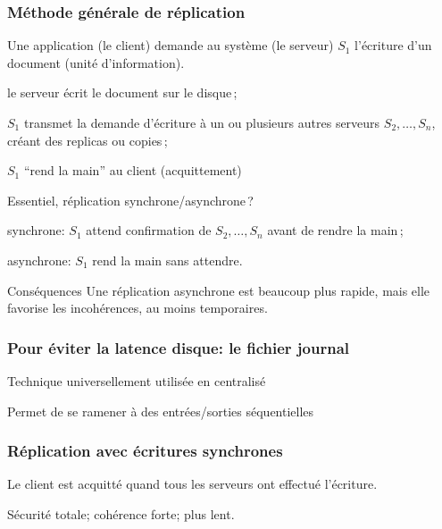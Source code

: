 \begin{frame}
\frametitle{Méthode générale de réplication}

Une \alert{application} (le client) demande au \alert{système} (le serveur) $S_1$ \alert{l'écriture}
d'un document (unité d'information).

\begin{redbullet}
  \item le serveur écrit le document sur le disque\,; 
  \item \alert{$S_1$ transmet la demande d'écriture à un ou plusieurs autres serveurs $S_2, \ldots, S_n$}, créant
     des \alert{replicas} ou \alert{copies}\,;
  \item $S_1$ ``rend la main'' au client (acquittement)
\end{redbullet}

Essentiel, réplication synchrone/asynchrone\,?

\begin{redbullet}
  \item \alert{synchrone}: $S_1$ \alert{attend} confirmation de $S_2, \ldots, S_n$ avant de rendre la main\,; 
 \item \alert{asynchrone}: $S_1$ rend la main \alert{sans attendre}. 
 \end{redbullet}

\begin{remblock}{Conséquences}
Une réplication \alert{asynchrone} est beaucoup plus rapide, mais elle favorise les \alert{incohérences}, au moins
temporaires.
\end{remblock}


\end{frame}


\begin{frame}
\frametitle{Pour éviter la latence disque: le fichier journal}

Technique universellement utilisée en centralisé

\vfill



\vfill

Permet de se ramener à des entrées/sorties \alert{séquentielles}

\end{frame}


\begin{frame}
\frametitle{Réplication avec écritures synchrones}

Le client est acquitté quand \alert{tous} les serveurs ont effectué l'écriture.

\vfill


\vfill

Sécurité totale; cohérence forte; \alert{plus lent}.

\end{frame}

